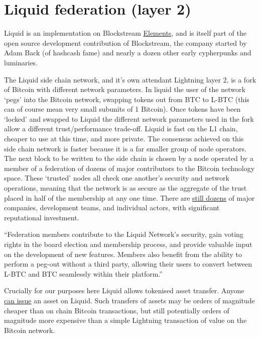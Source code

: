 \section{Liquid federation (layer 2)}
Liquid is an implementation on Blockstream \href{https://elementsproject.org/}{Elements}, and is itself part of the open source development contribution of Blockstream, the company started by Adam Back (of hashcash fame) and nearly a dozen other early cypherpunks and luminaries.\par 
The Liquid side chain network, and it's own attendant Lightning layer 2, is a fork of Bitcoin with different network parameters. In liquid the user of the network `pegs' into the Bitcoin network, swapping tokens out from BTC to L-BTC (this can of course mean very small subunits of 1 Bitcoin). Once tokens have been `locked' and swapped to Liquid the different network parameters used in the fork allow a different trust/performance trade-off. Liquid is fast on the L1 chain, cheaper to use at this time, and more private. The consensus achieved on this side chain network is faster because it is a far smaller group of node operators. The next block to be written to the side chain is chosen by a node operated by a member of a federation of dozens of major contributors to the Bitcoin technology space. These `trusted' nodes all check one another's security and network operations, meaning that the network is as secure as the aggregate of the trust placed in half of the membership at any one time. There are
\href{https://bitcoinmagazine.com/business/bitcoin-liquid-network-gains-six-new-federation-members}{still dozens} of major companies, development teams, and individual actors, with significant reputational investment.\par
``Federation members contribute to the Liquid Network's security, gain voting rights in the board election and membership process, and provide valuable input on the development of new features. Members also benefit from the ability to perform a peg-out without a third party, allowing their users to convert between L-BTC and BTC seamlessly within their platform.''\par
Crucially for our purposes here Liquid allows tokenised asset transfer. Anyone \href{https://docs.blockstream.com/liquid/developer-guide/developer-guide-index.html#issued-assets}{can issue} an asset on Liquid. Such transfers of assets may be orders of magnitude cheaper than on chain Bitcoin transactions, but still potentially orders of magnitude more expensive than a simple Lightning transaction of value on the Bitcoin network. \par 
